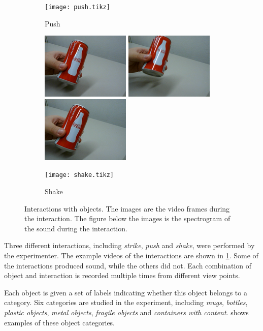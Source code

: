 \documentclass[letterpaper, 10 pt, conference]{ieeeconf}
\begin{document}
\begin{figure}[t]
\begin{subfigure}[b]{.8\linewidth}
    \texttt{[image: push.tikz]}
    \caption{Push}
  \end{subfigure}

  \vspace{20pt}
  \begin{subfigure}[b]{.8\linewidth}
    \centering
    \includegraphics[width=.25\linewidth]{shake0} \hspace{.4cm}
    \includegraphics[width=.25\linewidth]{shake1} \hspace{.4cm}
    \includegraphics[width=.25\linewidth]{shake2}

    \texttt{[image: shake.tikz]}
    \caption{Shake}
  \end{subfigure}
  \caption[Interactions with objects.]{Interactions with objects. The images are the video frames during the interaction. The figure below the images is the spectrogram of the sound during the interaction.}
  \label{fig:interaction}
\end{figure}

Three different interactions, including \emph{strike}, \emph{push} and \emph{shake}, were performed by the experimenter. The example videos of the interactions are shown in \cref{fig:interaction}. Some of the interactions produced sound, while the others did not. Each combination of object and interaction is recorded multiple times from different view points.

Each object is given a set of labels indicating whether this object belongs to a category. Six categories are studied in the experiment, including \emph{mugs}, \emph{bottles}, \emph{plastic objects}, \emph{metal objects}, \emph{fragile objects} and \emph{containers with content}.  shows examples of these object categories.
\end{document}
